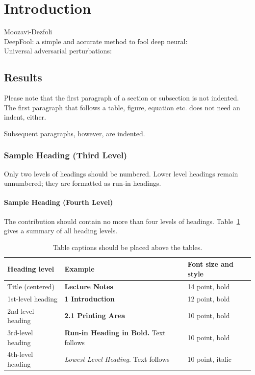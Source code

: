 \documentclass[runningheads]{llncs}
\begin{document}
\section{Introduction}
Moozavi-Dezfoli\cite{fawzi_robustness_2017}\\
DeepFool: a simple and accurate method to fool deep neural:\cite{moosavi-dezfooli_deepfool_2016}\\
Universal adversarial perturbations:\cite{moosavi-dezfooli_universal_2017}
\subsection{Results}
Please note that the first paragraph of a section or subsection is
not indented. The first paragraph that follows a table, figure,
equation etc. does not need an indent, either.

Subsequent paragraphs, however, are indented.

\subsubsection{Sample Heading (Third Level)} Only two levels of
headings should be numbered. Lower level headings remain unnumbered;
they are formatted as run-in headings.

\paragraph{Sample Heading (Fourth Level)}
The contribution should contain no more than four levels of
headings. Table~\ref{tab1} gives a summary of all heading levels.

\begin{table}
\caption{Table captions should be placed above the
tables.}\label{tab1}
\begin{tabular}{|l|l|l|}
\hline
Heading level &  Example & Font size and style\\
\hline
Title (centered) &  {\Large\bfseries Lecture Notes} & 14 point, bold\\
1st-level heading &  {\large\bfseries 1 Introduction} & 12 point, bold\\
2nd-level heading & {\bfseries 2.1 Printing Area} & 10 point, bold\\
3rd-level heading & {\bfseries Run-in Heading in Bold.} Text follows & 10 point, bold\\
4th-level heading & {\itshape Lowest Level Heading.} Text follows & 10 point, italic\\
\hline
\end{tabular}
\end{table}
\end{document}
